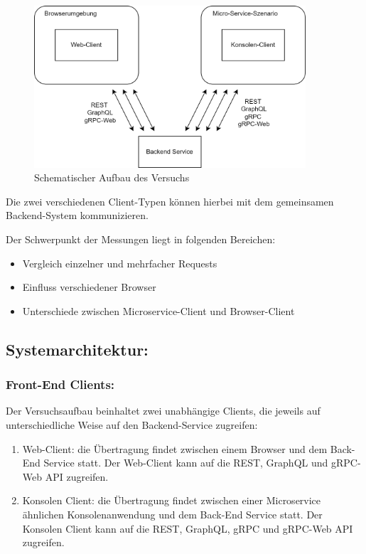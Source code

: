 \begin{figure}[htbp]
	\centering
	\includegraphics[width=0.9\textwidth]{images/Prototypschema.png}
	\caption{Schematischer Aufbau des Versuchs}
	\label{fig:backendservice}
\end{figure}

Die zwei verschiedenen Client-Typen können hierbei mit dem gemeinsamen Backend-System kommunizieren.

Der Schwerpunkt der Messungen liegt in folgenden Bereichen:

\begin{itemize}
	\item Vergleich einzelner und mehrfacher Requests
	\item Einfluss verschiedener Browser
	\item Unterschiede zwischen Microservice-Client und Browser-Client
\end{itemize}

\subsection*{Systemarchitektur:}

\subsubsection*{Front-End Clients:}
Der Versuchsaufbau beinhaltet zwei unabhängige Clients, die jeweils auf unterschiedliche Weise auf den Backend-Service zugreifen:
\begin{enumerate}
	\item Web-Client: die Übertragung findet zwischen einem Browser und dem Back-End Service statt. Der Web-Client kann auf die REST, GraphQL und gRPC-Web API zugreifen.
	\item Konsolen Client: die Übertragung findet zwischen einer Microservice ähnlichen Konsolenanwendung und dem Back-End Service statt. Der Konsolen Client kann auf die REST, GraphQL, gRPC und gRPC-Web API zugreifen.
	
\end{enumerate}

